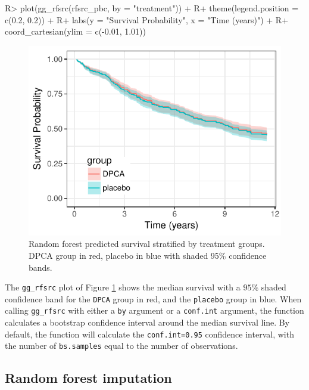 \documentclass[article]{jss}
\begin{document}
\begin{Schunk}
\begin{Sinput}
R> plot(gg_rfsrc(rfsrc_pbc, by = "treatment")) +
R+   theme(legend.position = c(0.2, 0.2)) +
R+   labs(y = "Survival Probability", x = "Time (years)") +
R+   coord_cartesian(ylim = c(-0.01, 1.01))
\end{Sinput}
\begin{figure}[!htb]

{\centering \includegraphics{fig-rfs/rfs-rfsrc-mean2-1} 

}

\caption[Random forest predicted survival stratified by treatment groups]{Random forest predicted survival stratified by treatment groups. DPCA group in red, placebo in blue with shaded 95\% confidence bands.}\label{fig:rfsrc-mean2}
\end{figure}
\end{Schunk}

The \texttt{gg\_rfsrc} plot of Figure \ref{fig:rfsrc-mean2} shows the
median survival with a \(95\%\) shaded confidence band for the
\texttt{DPCA} group in red, and the \texttt{placebo} group in blue. When
calling \texttt{gg\_rfsrc} with either a \texttt{by} argument or a
\texttt{conf.int} argument, the function calculates a bootstrap
confidence interval around the median survival line. By default, the
function will calculate the \texttt{conf.int=0.95} confidence interval,
with the number of \texttt{bs.samples} equal to the number of
observations.

\subsection{Random forest imputation}\label{random-forest-imputation}
\end{document}
